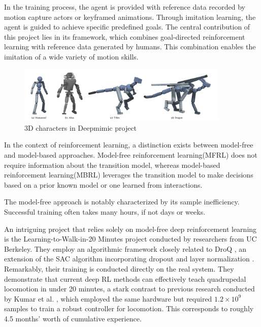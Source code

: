 In the training process, the agent is provided with reference data recorded by motion capture actors or keyframed animations. Through imitation learning, the agent is guided to achieve specific predefined goals. The central contribution of this project lies in its framework, which combines goal-directed reinforcement learning with reference data generated by humans. This combination enables the imitation of a wide variety of motion skills.

\begin{figure}[H]
  \centering
  \includegraphics[width=0.9\textwidth]{figures/deepmimic.png} %
  \caption{3D characters in Deepmimic project\cite{peng2018deepmimic}}
  \label{fig:deepmimic}
\end{figure}

In the context of reinforcement learning, a distinction exists between model-free and model-based approaches. Model-free reinforcement learning(MFRL) does not require information about the transition model, whereas model-based reinforcement learning(MBRL) leverages the transition model to make decisions based on a prior known model or one learned from interactions.

The model-free approach is notably characterized by its sample inefficiency. Successful training often takes many hours, if not days or weeks.

An intriguing project that relies solely on model-free deep reinforcement learning is the Learning-to-Walk-in-20 Minutes project\cite{smith2022walk} conducted by researchers from UC Berkeley. They employ an algorithmic framework closely related to DroQ \cite{hiraoka2021dropout}, an extension of the SAC algorithm \cite{haarnoja2018soft} incorporating dropout \cite{srivastava2014dropout} and layer normalization \cite{ba2016layer}. Remarkably, their training is conducted directly on the real system. They demonstrate that current deep RL methods can effectively teach quadrupedal locomotion in under 20 minutes, a stark contrast to previous research conducted by Kumar et al. \cite{kumar2021rma}, which employed the same hardware but required \(1.2 \times 10^9\) samples to train a robust controller for locomotion. This corresponds to roughly 4.5 months' worth of cumulative experience.


